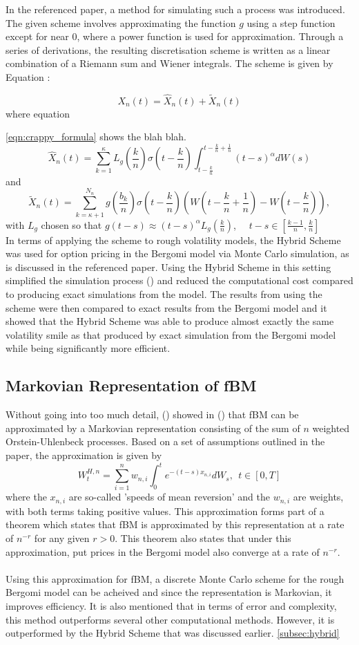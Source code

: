 \documentclass[12pt,oneside]{article}
\begin{document}
In the referenced paper, a method for simulating such a process was introduced. The given scheme involves approximating the function $g$ using a step function except for near 0, where a power function is used for approximation. Through a series of derivations,  the resulting discretisation scheme is written as a linear combination of a Riemann sum and Wiener integrals. The scheme is given by Equation \cite{new_paper}: 

$$X_n(t) = \hat{X}_n(t) + \tilde{X}_n(t)$$ where equation 

\ref{eqn:crappy_formula} shows the blah blah.
\begin{equation}
\label{eqn:crappy_formula}
\hat{X}_n(t) = \sum_{k=1}^{\kappa} L_g(\frac{k}{n}) \sigma (t-\frac{k}{n}) \int_{t-\frac{k}{n}}^{t-\frac{k}{n}+\frac{1}{n}}(t-s)^\alpha dW(s)
\end{equation}
and $$\tilde{X}_n(t) = \sum_{k=\kappa+1}^{N_n}g(\frac{b_k}{n})\sigma(t-\frac{k}{n})(W(t-\frac{k}{n}+\frac{1}{n})-W(t-\frac{k}{n})),$$ with $L_g$ chosen so that $g(t-s) \approx (t-s)^\alpha L_g(\frac{k}{n})$, \ \ $t-s \in [\frac{k-1}{n},\frac{k}{n}]$
\\
In terms of applying the scheme to rough volatility models, the Hybrid Scheme was used for option pricing in the Bergomi model via Monte Carlo simulation, as is discussed in the referenced paper. Using the Hybrid Scheme in this setting simplified the simulation process (\cite{see page 20 of BENNEDSON}) and reduced the computational cost compared to producing exact simulations from the model.  The results from using the scheme were then compared to exact results from the Bergomi model and it showed that the Hybrid Scheme was able to produce almost exactly the same volatility smile as that produced by exact simulation from the Bergomi model while being significantly more efficient.
\subsection{Markovian Representation of fBM}
Without going into too much detail, (\cite{HARMS}) showed in (\cite{PAPER}) that fBM can be approximated by a Markovian representation consisting of the sum of $n$ weighted Orstein-Uhlenbeck processes.  Based on a set of assumptions outlined in the paper, the approximation is given by $$W_t^{H,n} = \sum_{i=1}^n w_{n,i} \int_0^t e^{-(t-s)x_{n,i}}dW_s, \ \ t \in [0,T]$$ where the $x_{n,i}$ are so-called 'speeds of mean reversion' and the $w_{n,i}$ are weights, with both terms taking positive values. This approximation forms part of a theorem which states that fBM is approximated by this representation at a rate of $n^{-r}$ for any given $r>0$.  This theorem also states that under this approximation, put prices in the Bergomi model also converge at a rate of $n^{-r}$. 
\\
\\
Using this approximation for fBM, a discrete Monte Carlo scheme for the rough Bergomi model can be acheived and since the representation is Markovian, it improves efficiency. It is also mentioned that in terms of error and complexity,  this method outperforms several other computational methods. However, it is outperformed by the Hybrid Scheme that was discussed earlier. 
\ref{subsec:hybrid}
\end{document}

